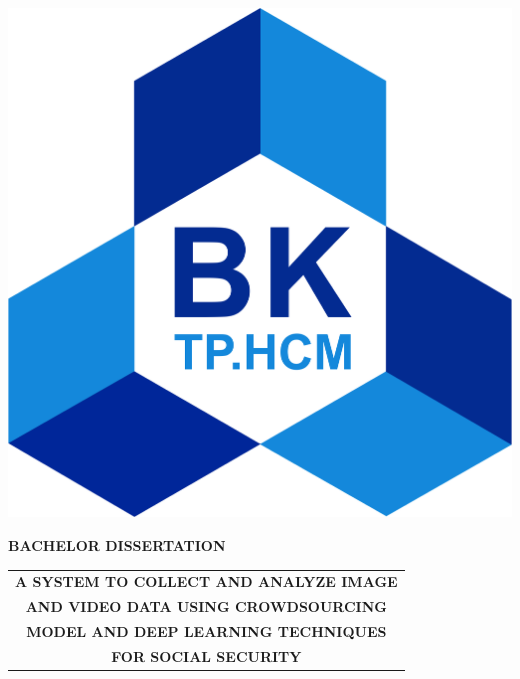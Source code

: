 \begin{titlepage}
\vspace{0.4cm}
\begin{center}
\includegraphics[scale=0.35]{hcmut.png}\\[1cm]
\end{center}
\vspace{-0.75cm}
\begin{center}
\large 
	\bfseries BACHELOR DISSERTATION \\
\end{center}
\vspace{-1.25cm}
\begin{center}
\Large
	\begin{tabular}{@{}c}
	 	\bfseries{A SYSTEM TO COLLECT AND ANALYZE IMAGE}\\  
		\bfseries{AND VIDEO DATA USING CROWDSOURCING} \\     
		\bfseries{MODEL AND DEEP LEARNING TECHNIQUES} \\ 
		\bfseries{ FOR SOCIAL SECURITY} \\[0.5cm] 

	\end{tabular}
\end{center}
	

\end{titlepage}
